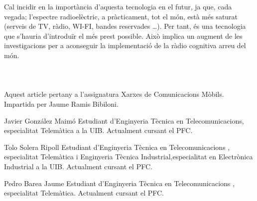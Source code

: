 \documentclass[10pt,journal,a4paper]{IEEEtran}
\begin{document}
Cal incidir en la importància d’aquesta tecnologia en el futur, ja que, cada vegada; l’espectre radioelèctric, a pràcticament, tot el món, està més saturat (serveis de TV, ràdio, WI-FI, bandes reservades \ldots).
Per tant, és una tecnologia que s’hauria d’introduïr el més prest possible. Això implica un augment de les investigacions per a aconseguir la implementació de la ràdio cognitiva arreu del món.
\\
\\
\\
\\
\newline
Aquest article pertany a l'assignatura Xarxes de Comunicacions Mòbils. Impartida per Jaume Ramis Bibiloni.


\begin{IEEEbiography}{Javier González Maimó}
Estudiant d'Enginyeria Tècnica en Telecomunicacions, especialitat Telemàtica a la UIB. Actualment cursant el PFC.
\end{IEEEbiography}
\begin{IEEEbiography}{Tolo Solera Ripoll}
Estudiant d'Enginyeria Tècnica en Telecomunicacions , especialitat Telemàtica i Enginyeria Tècnica Industrial,especialitat en Electrònica Industrial  a la UIB. Actualment cursant el PFC.
\end{IEEEbiography}

\begin{IEEEbiography}{Pedro Barea Jaume }
Estudiant d'Enginyeria Tècnica en Telecomunicacions , especialitat Telemàtica. Actualment cursant el PFC.
\end{IEEEbiography}
\end{document}
